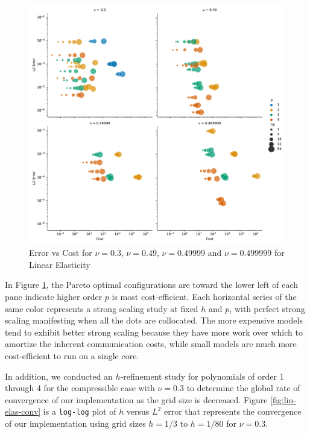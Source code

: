 \begin{figure}[pbt!]
 \begin{center}
      \includegraphics[width=1\textwidth]{../img/error-cost.pdf}
\end{center}
\caption{Error vs Cost for $\nu = 0.3$, $\nu = 0.49$, $\nu = 0.49999$ and $\nu = 0.499999$ for Linear Elasticity}
    \label{fig:error-cost}
\end{figure}

In Figure \ref{fig:error-cost}, the Pareto optimal configurations are toward the lower left of each pane indicate higher order $p$ is most cost-efficient.
Each horizontal series of the same color represents a strong scaling study at fixed $h$ and $p$, with perfect strong scaling manifesting when all the dots are collocated.
The more expensive models tend to exhibit better strong scaling because they have more work over which to amortize the inherent communication costs, while small models are much more cost-efficient to run on a single core.

In addition, we conducted an $h$-refinement study for polynomials of order 1 through 4 for the compressible case with $\nu = 0.3$ to determine the global rate of convergence of our implementation as the grid size is decreased.
Figure \ref{fig:lin-elas-conv} is a \texttt{log-log} plot of $h$ versus $L^2$ error that represents the convergence of our implementation using grid sizes $h = 1/3$ to $h = 1/80$ for $\nu = 0.3$.

